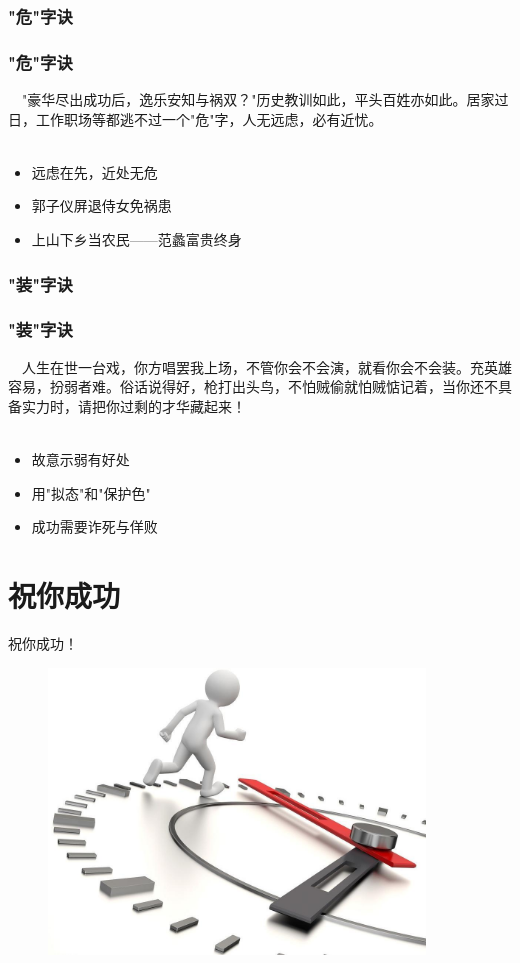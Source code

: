 \subsubsection{"危"字诀}
\begin{frame}
\frametitle{"危"字诀}
\noindent\handr~~"豪华尽出成功后，逸乐安知与祸双？"历史教训如此，平头百姓亦如此。居家过日，工作职场等都逃不过一个"危"字，人无远虑，必有近忧。
~\\
~\\
\begin{itemize}
    \item 远虑在先，近处无危
    \item 郭子仪屏退侍女免祸患
    \item 上山下乡当农民——范蠡富贵终身
\end{itemize}
\end{frame}

\subsubsection{"装"字诀}
\begin{frame}
\frametitle{"装"字诀}
\noindent\handr~~人生在世一台戏，你方唱罢我上场，不管你会不会演，就看你会不会装。充英雄容易，扮弱者难。俗话说得好，枪打出头鸟，不怕贼偷就怕贼惦记着，当你还不具备实力时，请把你过剩的才华藏起来！
~\\
~\\
\begin{itemize}
    \item 故意示弱有好处
    \item 用"拟态"和"保护色"
    \item 成功需要诈死与佯败
\end{itemize}
\end{frame}

\section{祝你成功}
\begin{frame}{祝你成功！}
	\begin{figure}[http]
    \centering
    \includegraphics[width=10cm]{run_time.jpg}
    \label{fig:run_time}
    \end{figure}
\end{frame}

